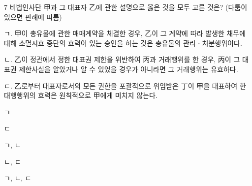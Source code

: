 \begin{question}{7}
비법인사단 甲과 그 대표자 乙에 관한 설명으로 옳은 것을 모두 고른 것은? (다툼이 있으면 판례에 따름)
\begin{framedtext}
ㄱ. 甲이 총유물에 관한 매매계약을 체결한 경우, 乙이 그 계약에 따라 발생한 채무에 대해 소멸시효 중단의 효력이 있는 승인을 하는 것은 총유물의 관리ㆍ처분행위이다. \par
ㄴ. 乙이 정관에서 정한 대표권 제한을 위반하여 丙과 거래행위를 한 경우, 丙이 그 대표권 제한사실을 알았거나 알 수 있었을 경우가 아니라면 그 거래행위는 유효하다. \par
ㄷ. 乙로부터 대표자로서의 모든 권한을 포괄적으로 위임받은 丁이 甲을 대표하여 한 대행행위의 효력은 원칙적으로 甲에게 미치지 않는다. \par
\end{framedtext}
\begin{choices}
  \item ㄱ
  \item ㄷ
  \item ㄱ, ㄴ
  \item ㄴ, ㄷ
  \item ㄱ, ㄴ, ㄷ
\end{choices}
\end{question}
